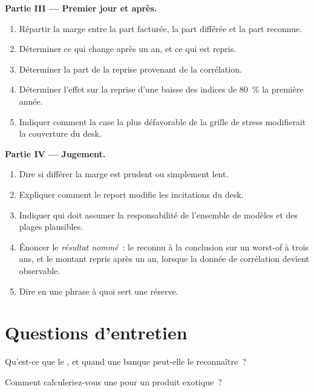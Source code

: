 \begin{problem}
\medskip\noindent\textbf{Partie III --- Premier jour et après.}
\begin{enumerate}[resume]
\item Répartir la marge entre la part facturée, la part différée et la part reconnue.
\item Déterminer ce qui change après un an, et ce qui est repris.
\item Déterminer la part de la reprise provenant de la corrélation.
\item Déterminer l'effet sur la reprise d'une baisse des indices de 80~\% la première année.
\item Indiquer comment la case la plus défavorable de la grille de stress modifierait la couverture du desk.
\end{enumerate}

\medskip\noindent\textbf{Partie IV --- Jugement.}
\begin{enumerate}[resume]
\item Dire si différer la marge est prudent ou simplement lent.
\item Expliquer comment le report modifie les incitations du desk.
\item Indiquer qui doit assumer la responsabilité de l'ensemble de modèles et des plages plausibles.
\item Énoncer le \emph{résultat nommé}~: le  reconnu à la conclusion sur un  worst-of à trois ans, et le montant repris après un an, lorsque
la donnée de corrélation devient observable.
\item Dire en une phrase à quoi sert une réserve.
\end{enumerate}
\end{problem}

\section{Questions d'entretien}

\begin{interviewq}\label{iq:dv:managing-an-exotic-book:1}
Qu'est-ce que le , et quand une banque peut-elle le reconnaître~?
\end{interviewq}

\begin{interviewq}\label{iq:dv:managing-an-exotic-book:2}
Comment calculeriez-vous une  pour un produit exotique~?
\end{interviewq}

